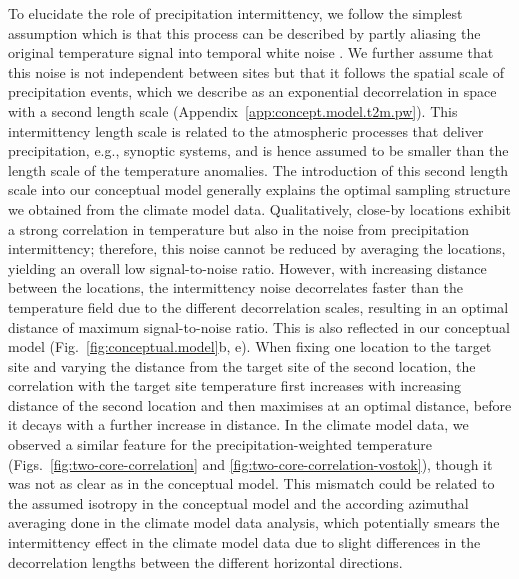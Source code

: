 \documentclass[draft]{agujournal2019}
\begin{document}
To elucidate the role of precipitation intermittency, we follow the simplest
assumption which is that this process can be described by partly aliasing the
original temperature signal into temporal white noise
\cite{Laepple2018,Casado2020}. We further assume that this noise is not
independent between sites but that it follows the spatial scale of precipitation
events, which we describe as an exponential decorrelation in space with a second
length scale (Appendix~\ref{app:concept.model.t2m.pw}). This intermittency
length scale is related to the atmospheric processes that deliver precipitation,
e.g., synoptic systems, and is hence assumed to be smaller than the length scale
of the temperature anomalies. The introduction of this second length scale into
our conceptual model generally explains the optimal sampling structure we
obtained from the climate model data. Qualitatively, close-by locations exhibit
a strong correlation in temperature but also in the noise from precipitation
intermittency; therefore, this noise cannot be reduced by averaging the
locations, yielding an overall low signal-to-noise ratio. However, with
increasing distance between the locations, the intermittency noise decorrelates
faster than the temperature field due to the different decorrelation scales,
resulting in an optimal distance of maximum signal-to-noise ratio. This is also
reflected in our conceptual model (Fig.~\ref{fig:conceptual.model}b, e). When
fixing one location to the target site and varying the distance from the target
site of the second location, the correlation with the target site temperature
first increases with increasing distance of the second location and then
maximises at an optimal distance, before it decays with a further increase in
distance. In the climate model data, we observed a similar feature for the
precipitation-weighted temperature (Figs.~\ref{fig:two-core-correlation} and
\ref{fig:two-core-correlation-vostok}), though it was not as clear as in the
conceptual model. This mismatch could be related to the assumed isotropy in the
conceptual model and the according azimuthal averaging done in the climate model
data analysis, which potentially smears the intermittency effect in the climate
model data due to slight differences in the decorrelation lengths between the
different horizontal directions.
\end{document}

